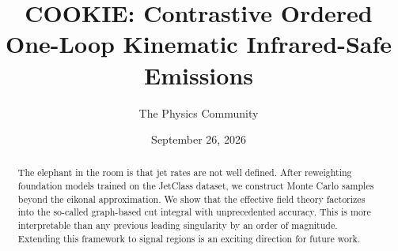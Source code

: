 \documentclass[11pt]{article}
\title{COOKIE: Contrastive Ordered One-Loop Kinematic Infrared-Safe Emissions}
\author{The Physics Community}
\date{September 26, 2026}
\begin{document}
\maketitle
\begin{abstract}
The elephant in the room is that jet rates are not well defined. After
reweighting foundation models trained on the JetClass dataset, we
construct Monte Carlo samples beyond the eikonal approximation. We show
that the effective field theory factorizes into the so-called
graph-based cut integral with unprecedented accuracy. This is more
interpretable than any previous leading singularity by an order of
magnitude. Extending this framework to signal regions is an exciting
direction for future work.
\end{abstract}
\tableofcontents




\nocite{*}


\end{document}
